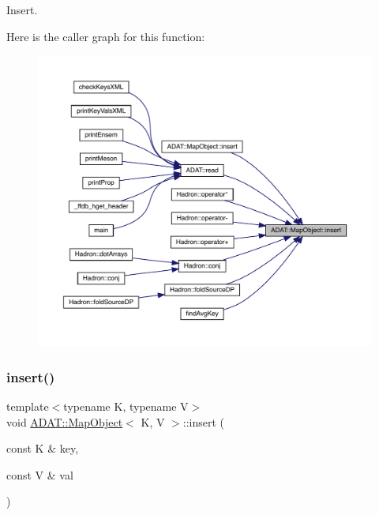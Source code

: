Insert. 

Here is the caller graph for this function\+:\nopagebreak
\begin{figure}[H]
\begin{center}
\leavevmode
\includegraphics[width=350pt]{da/d29/classADAT_1_1MapObject_a5389738841dca1228aefe6935c464a78_icgraph}
\end{center}
\end{figure}
\mbox{\label{classADAT_1_1MapObject_a5389738841dca1228aefe6935c464a78}} 
\subsubsection{\texorpdfstring{insert()}{insert()}\hspace{0.1cm}{\footnotesize\ttfamily [2/6]}}
{\footnotesize\ttfamily template$<$typename K, typename V$>$ \\
void \mbox{\hyperlink{classADAT_1_1MapObject}{A\+D\+A\+T\+::\+Map\+Object}}$<$ K, V $>$\+::insert (\begin{DoxyParamCaption}\item[{const K \&}]{key,  }\item[{const V \&}]{val }\end{DoxyParamCaption})\hspace{0.3cm}{\ttfamily [inline]}}



